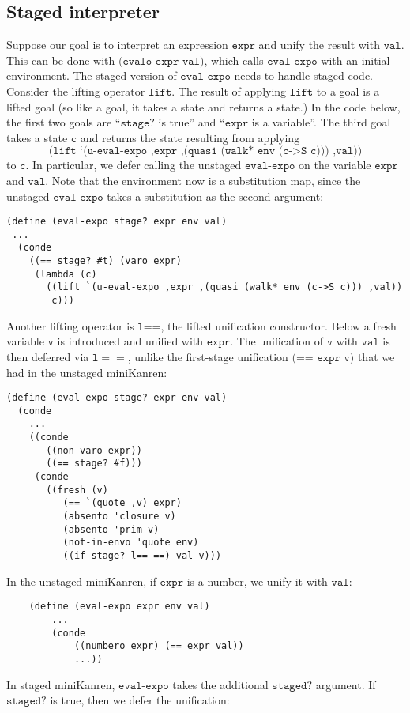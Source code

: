 \documentclass[11pt]{article}
\theoremstyle{definition}
\newcommand{\code}[1]{\texttt{#1}}
\newcommand\tab[1][1cm]{\hspace*{#1}}
\begin{document}
\subsection{Staged interpreter}
\tab Suppose our goal is to interpret an expression $\code{expr}$ and unify the result with $\code{val}$. This can be done with $\code{(evalo expr val)}$, which calls $\code{eval-expo}$ with an initial environment.
The staged version of $\code{eval-expo}$ needs to handle staged code. Consider the lifting operator $\code{lift}$. The result of applying $\code{lift}$ to a goal is a lifted goal (so like a goal, it takes a state and returns a state.) In the code below, the first two goals are ``$\code{stage?}$ is true'' and  ``$\code{expr}$ is a variable''. The third goal takes a state $\code{c}$ and returns the state resulting from applying $$\code{(lift `(u-eval-expo ,expr ,(quasi (walk* env (c->S c))) ,val))}$$ to $\code{c}$. In particular, we defer calling the unstaged $\code{eval-expo}$ on the variable $\code{expr}$ and $\code{val}$. Note that the environment now is a substitution map, since the unstaged $\code{eval-expo}$ takes a substitution as the second argument:
\begin{lstlisting}
(define (eval-expo stage? expr env val)
 ...
  (conde
    ((== stage? #t) (varo expr)
     (lambda (c)
       ((lift `(u-eval-expo ,expr ,(quasi (walk* env (c->S c))) ,val))
        c)))
\end{lstlisting}
\tab Another lifting operator is $\code{l==}$, the lifted unification constructor. Below a fresh variable $\code{v}$ is introduced and unified with $\code{expr}$. The unification of $\code{v}$ with $\code{val}$ is then deferred via $\mathtt{l==}$, unlike the first-stage unification $\code{(== expr v)}$ that we had in the unstaged miniKanren:
\begin{lstlisting}
(define (eval-expo stage? expr env val)
  (conde
    ...    
    ((conde
       ((non-varo expr))
       ((== stage? #f)))
     (conde
       ((fresh (v)
          (== `(quote ,v) expr)
          (absento 'closure v)
          (absento 'prim v)
          (not-in-envo 'quote env)
          ((if stage? l== ==) val v)))
\end{lstlisting}
In the unstaged miniKanren, if $\code{expr}$ is a number, we unify it with $\code{val}$: 
\begin{lstlisting}
    (define (eval-expo expr env val)	
        ...
        (conde
            ((numbero expr) (== expr val))
            ...))
\end{lstlisting} 
In staged miniKanren, $\code{eval-expo}$ takes the additional $\code{staged?}$ argument. If $\code{staged?}$ is true, then we defer the unification: 
\end{document}
